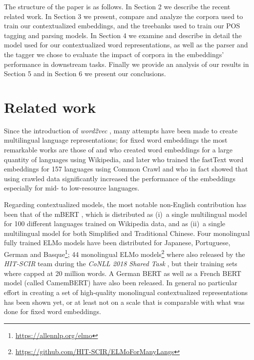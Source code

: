The  structure  of  the  paper  is  as  follows. In Section 2 we describe the recent related work. In Section 3  we present, compare and analyze the corpora used to train our contextualized embeddings, and the treebanks used to train our POS tagging and parsing models. In Section 4 we examine and describe in detail the model used for our contextualized word representations, as well as the parser and the tagger we chose to evaluate the impact of corpora in the embeddings' performance in downstream tasks. Finally we provide an analysis of our results in Section 5 and in Section 6 we present our conclusions.

\section{Related work}

Since the introduction of \emph{word2vec} \citep{mikolov-etal-2013-distributed}, many attempts have been made to create multilingual language representations; for fixed word embeddings the most remarkable works are those of \citep{al-rfou-etal-2013-polyglot} and \citep{bojanowski-etal-2017-enriching} who created word embeddings for a large quantity of languages using Wikipedia, and later \citep{grave-etal-2018-learning} who trained the fastText word embeddings for 157 languages using Common Crawl and who in fact showed that using crawled data significantly increased the performance of the embeddings especially for mid- to low-resource languages.

Regarding contextualized models, the most notable non-English contribution has been that of the mBERT \citep{devlin-etal-2019-bert}, which is distributed as (i)~a single multilingual model for 100 different languages trained on Wikipedia data, and as (ii)~a single multilingual model for both Simplified and Traditional Chinese. Four monolingual fully trained ELMo models have been distributed for Japanese, Portuguese, German and Basque\footnote{\url{https://allennlp.org/elmo}}; 44 monolingual ELMo models\footnote{\url{https://github.com/HIT-SCIR/ELMoForManyLangs}} where also released by the \emph{HIT-SCIR} team \citep{che-etal-2018-towards} during the \emph{CoNLL 2018 Shared Task} \citep{zeman-etal-2018-conll}, but their training sets where capped at 20 million words. A German BERT \citep{chan-etal-2019-german} as well as a French BERT model (called CamemBERT) \citep{martin-etal-2020-camembert} have also been released. In general no particular effort in creating a set of high-quality monolingual contextualized representations has been shown yet, or at least not on a scale that is comparable with what was done for fixed word embeddings.

